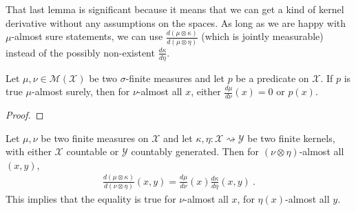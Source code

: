 That last lemma is significant because it means that we can get a kind of kernel derivative without any assumptions on the spaces.
As long as we are happy with $\mu$-almost sure statements, we can use $\frac{d (\mu \otimes \kappa)}{d (\mu \otimes \eta)}$ (which is jointly measurable) instead of the possibly non-existent $\frac{d \kappa}{d \eta}$.


\begin{lemma}
  \label{lem:ae_rnDeriv_ne_zero}
  \leanok
  \uses{}
  Let $\mu, \nu \in \mathcal M(\mathcal X)$ be two $\sigma$-finite measures and let $p$ be a predicate on $\mathcal X$.
  If $p$ is true $\mu$-almost surely, then for $\nu$-almost all $x$, either $\frac{d\mu}{d\nu}(x) = 0$ or $p(x)$.
\end{lemma}

\begin{proof}\leanok
\uses{}

\end{proof}


\begin{lemma}
  \label{lem:rnDeriv_compProd}
  \leanok
  Let $\mu, \nu$ be two finite measures on $\mathcal X$ and let $\kappa, \eta : \mathcal X \rightsquigarrow \mathcal Y$ be two finite kernels, with either $\mathcal X$ countable or $\mathcal{Y}$ countably generated.
  Then for $(\nu \otimes \eta)$-almost all $(x, y)$,
  \begin{align*}
  \frac{d (\mu \otimes \kappa)}{d (\nu \otimes \eta)}(x,y) = \frac{d\mu}{d\nu}(x)\frac{d \kappa}{d \eta}(x,y)
  \: .
  \end{align*}
  This implies that the equality is true for $\nu$-almost all $x$, for $\eta(x)$-almost all $y$.
\end{lemma}

